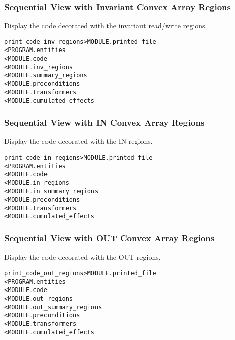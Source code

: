 \documentclass[a4paper]{report}
\newenvironment{PipsMake}{\begin{alltt}}{\end{alltt}}
\newenvironment{PipsPass}[1]{\label{pass:#1}}{}
\begin{document}
\subsubsection{Sequential View with Invariant Convex Array Regions}

\begin{PipsPass}{print_code_inv_regions}
Display the code decorated with the invariant read/write regions.
\end{PipsPass}

\begin{PipsMake}
print_code_inv_regions              > MODULE.printed_file
        < PROGRAM.entities
        < MODULE.code
        < MODULE.inv_regions
        < MODULE.summary_regions
        < MODULE.preconditions
        < MODULE.transformers
        < MODULE.cumulated_effects
\end{PipsMake}


\subsubsection{Sequential View with IN Convex Array Regions}

\begin{PipsPass}{print_code_in_regions}
Display the code decorated with the IN regions.
\end{PipsPass}

\begin{PipsMake}
print_code_in_regions              > MODULE.printed_file
        < PROGRAM.entities
        < MODULE.code
        < MODULE.in_regions
        < MODULE.in_summary_regions
        < MODULE.preconditions
        < MODULE.transformers
        < MODULE.cumulated_effects
\end{PipsMake}

\subsubsection{Sequential View with OUT Convex Array Regions}

\begin{PipsPass}{print_code_out_regions}
Display the code decorated with the OUT regions.
\end{PipsPass}

\begin{PipsMake}
print_code_out_regions              > MODULE.printed_file
        < PROGRAM.entities
        < MODULE.code
        < MODULE.out_regions
        < MODULE.out_summary_regions
        < MODULE.preconditions
        < MODULE.transformers
        < MODULE.cumulated_effects
\end{PipsMake}
\end{document}
